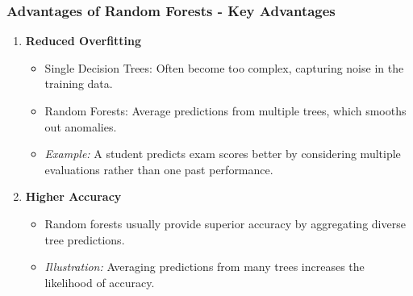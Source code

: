 \documentclass[aspectratio=169]{beamer}
\begin{document}
\begin{frame}[fragile]
    \frametitle{Advantages of Random Forests - Key Advantages}
    \begin{enumerate}
        \item \textbf{Reduced Overfitting}
        \begin{itemize}
            \item Single Decision Trees: Often become too complex, capturing noise in the training data.
            \item Random Forests: Average predictions from multiple trees, which smooths out anomalies.
            \item \textit{Example:} A student predicts exam scores better by considering multiple evaluations rather than one past performance.
        \end{itemize}
        
        \item \textbf{Higher Accuracy}
        \begin{itemize}
            \item Random forests usually provide superior accuracy by aggregating diverse tree predictions.
            \item \textit{Illustration:} Averaging predictions from many trees increases the likelihood of accuracy.
        \end{itemize}
    \end{enumerate}
\end{frame}
\end{document}
